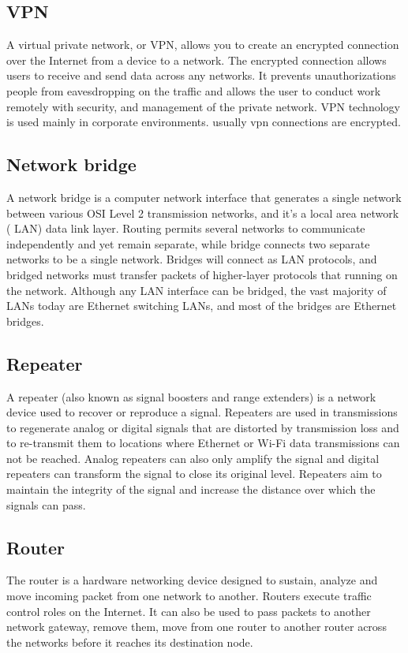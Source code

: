 \documentclass[12pt]{article}
\begin{document}
 \subsection{VPN}
 A virtual private network, or VPN, allows you to create  an encrypted connection over the Internet from a device to a network. The encrypted connection allows users to receive and send  data across any networks. It prevents unauthorizations people from eavesdropping on the traffic and allows the user to conduct work remotely with security, and management of the private network. VPN technology is used mainly in corporate environments. usually vpn connections are encrypted.
 \subsection{Network bridge}
 A network bridge is a computer network interface that generates a single network between various OSI Level 2 transmission networks, and it's a local area network ( LAN) data link layer. Routing permits several networks to communicate independently and yet remain separate, while bridge connects two separate networks to be a single network. Bridges will connect as LAN protocols, and bridged networks must transfer packets of higher-layer protocols that running on the network. Although any LAN interface can be bridged, the vast majority of LANs today are Ethernet switching LANs, and most of the bridges are Ethernet bridges.\cite{8}
 
\subsection{Repeater}
A repeater (also known as signal boosters and range extenders) is a network device used to recover or reproduce a signal. Repeaters are used in transmissions to regenerate analog or digital signals that are distorted by transmission loss and to re-transmit them to locations where Ethernet or Wi-Fi data transmissions can not be reached. Analog repeaters can also only amplify the signal and digital repeaters can transform the signal to close its original level. Repeaters aim to maintain the integrity of the signal and increase the distance over which the signals can pass. \cite{9}
\subsection{Router}

The router is a hardware networking device designed to sustain, analyze and move incoming packet from one network to another. Routers execute traffic control roles on the Internet. It can also be used to pass packets to another network gateway, remove them, move from one router to another router across the networks before it reaches its destination node.\cite{10}
\end{document}
